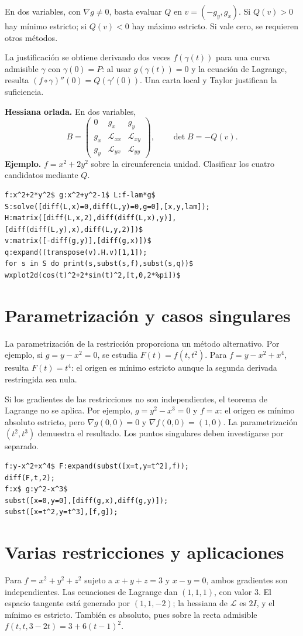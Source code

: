 \documentclass[12pt,a4paper]{article}
\begin{document}
En dos variables, con $\nabla g\ne0$, basta evaluar $Q$ en $v=(-g_y,g_x)$. Si $Q(v)>0$ hay mínimo estricto; si $Q(v)<0$ hay máximo estricto. Si vale cero, se requieren otros métodos.

La justificación se obtiene derivando dos veces $f(\gamma(t))$ para una curva admisible $\gamma$ con $\gamma(0)=P$: al usar $g(\gamma(t))=0$ y la ecuación de Lagrange, resulta $(f\circ\gamma)''(0)=Q(\gamma'(0))$. Una carta local y Taylor justifican la suficiencia.

\textbf{Hessiana orlada.} En dos variables,
\[B=\begin{pmatrix}0&g_x&g_y\\g_x&\mathcal L_{xx}&\mathcal L_{xy}\\g_y&\mathcal L_{yx}&\mathcal L_{yy}\end{pmatrix},\qquad \det B=-Q(v).\]
\textbf{Ejemplo.} $f=x^2+2y^2$ sobre la circunferencia unidad. Clasificar los cuatro candidatos mediante $Q$.
\begin{lstlisting}
f:x^2+2*y^2$ g:x^2+y^2-1$ L:f-lam*g$
S:solve([diff(L,x)=0,diff(L,y)=0,g=0],[x,y,lam]);
H:matrix([diff(L,x,2),diff(diff(L,x),y)],[diff(diff(L,y),x),diff(L,y,2)])$
v:matrix([-diff(g,y)],[diff(g,x)])$
q:expand((transpose(v).H.v)[1,1]);
for s in S do print(s,subst(s,f),subst(s,q))$
wxplot2d(cos(t)^2+2*sin(t)^2,[t,0,2*%pi])$
\end{lstlisting}
\section{Parametrización y casos singulares}
La parametrización de la restricción proporciona un método alternativo. Por ejemplo, si $g=y-x^2=0$, se estudia $F(t)=f(t,t^2)$. Para $f=y-x^2+x^4$, resulta $F(t)=t^4$: el origen es mínimo estricto aunque la segunda derivada restringida sea nula.

Si los gradientes de las restricciones no son independientes, el teorema de Lagrange no se aplica. Por ejemplo, $g=y^2-x^3=0$ y $f=x$: el origen es mínimo absoluto estricto, pero $\nabla g(0,0)=0$ y $\nabla f(0,0)=(1,0)$. La parametrización $(t^2,t^3)$ demuestra el resultado. Los puntos singulares deben investigarse por separado.
\begin{lstlisting}
f:y-x^2+x^4$ F:expand(subst([x=t,y=t^2],f));
diff(F,t,2);
f:x$ g:y^2-x^3$
subst([x=0,y=0],[diff(g,x),diff(g,y)]);
subst([x=t^2,y=t^3],[f,g]);
\end{lstlisting}
\section{Varias restricciones y aplicaciones}
Para $f=x^2+y^2+z^2$ sujeto a $x+y+z=3$ y $x-y=0$, ambos gradientes son independientes. Las ecuaciones de Lagrange dan $(1,1,1)$, con valor $3$. El espacio tangente está generado por $(1,1,-2)$; la hessiana de $\mathcal L$ es $2I$, y el mínimo es estricto. También es absoluto, pues sobre la recta admisible $f(t,t,3-2t)=3+6(t-1)^2$.
\end{document}
